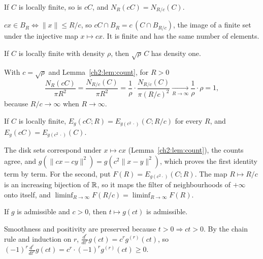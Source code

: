 \begin{lemma}\label{ch2:lem:count}
If $C$ is locally finite, so is $cC$, and $N_R(cC)=N_{R/c}(C)$.
\end{lemma}
\begin{humanproof}
$cx\in B_R\iff\|x\|\le R/c$, so $cC\cap B_R=c\,(C\cap B_{R/c})$, the image of a finite set under the injective map
$x\mapsto cx$. It is finite and has the same number of elements.
\end{humanproof}

\begin{lemma}\label{ch2:lem:dens}
If $C$ is locally finite with density $\rho$, then $\sqrt\rho\,C$ has density one.
\end{lemma}
\begin{humanproof}
With $c=\sqrt\rho$ and Lemma~\ref{ch2:lem:count}, for $R>0$
\[
\frac{N_R(cC)}{\pi R^2}=\frac{N_{R/c}(C)}{\pi R^2}=\frac1\rho\cdot\frac{N_{R/c}(C)}{\pi(R/c)^2}
\xrightarrow[R\to\infty]{}\frac1\rho\cdot\rho=1,
\]
because $R/c\to\infty$ when $R\to\infty$.
\end{humanproof}

\begin{lemma}\label{ch2:lem:en}
If $C$ is locally finite, $E_g(cC;R)=E_{g(c^2\,\cdot)}(C;R/c)$ for every $R$, and $E_g(cC)=E_{g(c^2\,\cdot)}(C)$.
\end{lemma}
\begin{humanproof}
The disk sets correspond under $x\mapsto cx$ (Lemma~\ref{ch2:lem:count}), the counts agree, and
$g(\|cx-cy\|^2)=g(c^2\|x-y\|^2)$, which proves the first identity term by term. For the second, put
$F(R)=E_{g(c^2\cdot)}(C;R)$. The map $R\mapsto R/c$ is an increasing bijection of $\mathbb{R}$, so it maps the filter of
neighbourhoods of $+\infty$ onto itself, and $\liminf_{R\to\infty}F(R/c)=\liminf_{R\to\infty}F(R)$.
\end{humanproof}

\begin{lemma}\label{ch2:lem:adm}
If $g$ is admissible and $c>0$, then $t\mapsto g(ct)$ is admissible.
\end{lemma}
\begin{humanproof}
Smoothness and positivity are preserved because $t>0\Rightarrow ct>0$. By the chain rule and induction on $r$,
$\frac{d^r}{dt^r}g(ct)=c^r g^{(r)}(ct)$, so $(-1)^r\frac{d^r}{dt^r}g(ct)=c^r\cdot(-1)^rg^{(r)}(ct)\ge0$.
\end{humanproof}

